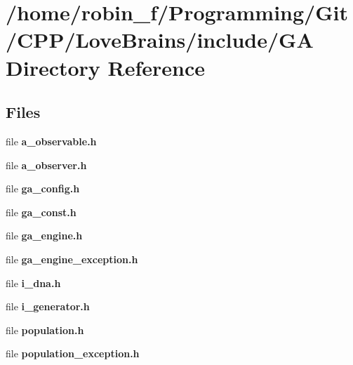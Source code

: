 \section{/home/robin\+\_\+f/\+Programming/\+Git/\+C\+P\+P/\+Love\+Brains/include/\+G\+A Directory Reference}
\label{dir_58ab3b552f299e3bcd70c44f2cc2233a}
\subsection*{Files}
\begin{DoxyCompactItemize}
\item 
file {\bfseries a\+\_\+observable.\+h}
\item 
file {\bfseries a\+\_\+observer.\+h}
\item 
file {\bfseries ga\+\_\+config.\+h}
\item 
file {\bfseries ga\+\_\+const.\+h}
\item 
file {\bfseries ga\+\_\+engine.\+h}
\item 
file {\bfseries ga\+\_\+engine\+\_\+exception.\+h}
\item 
file {\bfseries i\+\_\+dna.\+h}
\item 
file {\bfseries i\+\_\+generator.\+h}
\item 
file {\bfseries population.\+h}
\item 
file {\bfseries population\+\_\+exception.\+h}
\end{DoxyCompactItemize}
